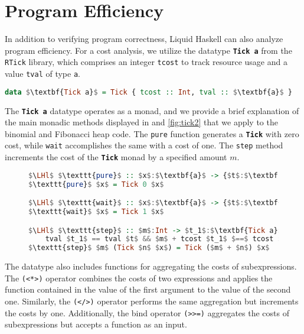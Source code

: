 \documentclass{clmthesis}
\begin{document}
\section{Program Efficiency}\label{lh_eff}
In addition to verifying program correctness, Liquid Haskell can also analyze program efficiency. For a cost analysis, we utilize the datatype \textbf{\lstinline{Tick a}} from the \texttt{RTick} library, which comprises an integer \lstinline{tcost} to track resource usage and a value \lstinline{tval} of type \texttt{a}.
\begin{lstlisting}[mathescape=true, language=haskell]
data $\textbf{Tick a}$ = Tick { tcost :: Int, tval :: $\textbf{a}$ }
\end{lstlisting}
The \textbf{\lstinline{Tick a}} datatype operates as a monad, and we provide a brief explanation of the main monadic methods displayed in  and \ref{fig:tick2} that we apply to the binomial and Fibonacci heap code. The \texttt{pure} function generates a \textbf{\lstinline{Tick}} with zero cost, while \texttt{wait} accomplishes the same with a cost of one. The \texttt{step} method increments the cost of the \textbf{\lstinline{Tick}} monad by a specified amount $m$.
\begin{figure}[h]
\begin{lstlisting}[mathescape=true, language=haskell, caption={Operators of the \textbf{\lstinline{Tick} a} datatype.},captionpos=b, label=fig:tick1]
$\LHl$ $\texttt{pure}$ :: $x$:$\textbf{a}$ -> {$t$:$\textbf{Tick a}$ | $x$ $==$ tval $t$ && 0 $==$ tcost $t$} $\LHr$
$\texttt{pure}$ $x$ = Tick 0 $x$

$\LHl$ $\texttt{wait}$ :: $x$:$\textbf{a}$ -> {$t$:$\textbf{Tick a}$ | $x$ $==$ tval $t$ && 1 $==$ tcost $t$} $\LHr$
$\texttt{wait}$ $x$ = Tick 1 $x$

$\LHl$ $\texttt{step}$ :: $m$:Int -> $t_1$:$\textbf{Tick a}$  -> {$t$:$\textbf{Tick a}$ | 
	tval $t_1$ == tval $t$ && $m$ + tcost $t_1$ $==$ tcost $t$} $\LHr$
$\texttt{step}$ $m$ (Tick $n$ $x$) = Tick ($m$ + $n$) $x$
\end{lstlisting}
\end{figure}

The datatype also includes functions for aggregating the costs of subexpressions. The \texttt{(<*>)} operator combines the costs of two expressions and applies the function contained in the value of the first argument to the value of the second one. Similarly, the \texttt{(</>)} operator performs the same aggregation but increments the costs by one. Additionally, the bind operator \texttt{(>>=)} aggregates the costs of subexpressions but accepts a function as an input.
\end{document}
